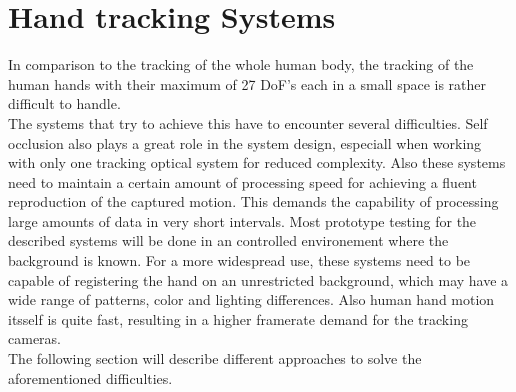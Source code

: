 \section{Hand tracking Systems}
In comparison to the tracking of the whole human body, the tracking of the human hands with their maximum of 27 DoF's each in a small space is rather difficult to handle.\\
The systems that try to achieve this have to encounter several difficulties. Self occlusion also plays a great role in the system design, especiall when working with only one tracking optical system for reduced complexity. Also these systems need to maintain a certain amount of processing speed for achieving a fluent reproduction of the captured motion. This demands the capability of processing large amounts of data in very short intervals. Most prototype testing for the described systems will be done in an controlled environement where the background is known. For a more widespread use, these systems need to be capable of registering the hand on an unrestricted background, which may have a wide range of patterns, color and lighting differences. Also human hand motion itsself is quite fast, resulting in a higher framerate demand for the tracking cameras.\\
The following section will describe different approaches to solve the aforementioned difficulties.

